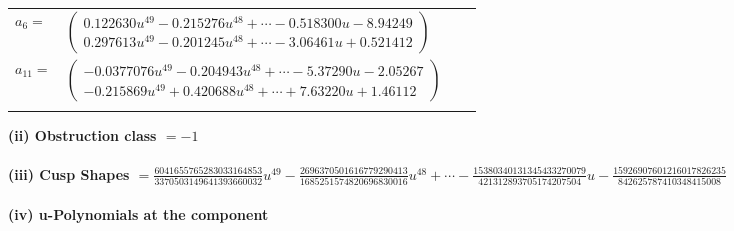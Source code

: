 \documentclass[1p]{elsarticle_modified}
\theoremstyle{definition}
\begin{document}
\begin{tabular}{m{7pt} m{180pt} m{7pt} m{180pt} }
\flushright $a_{6}=$&$\begin{pmatrix}0.122630 u^{49}-0.215276 u^{48}+\cdots-0.518300 u-8.94249\\0.297613 u^{49}-0.201245 u^{48}+\cdots-3.06461 u+0.521412\end{pmatrix}$ \\
\flushright $a_{11}=$&$\begin{pmatrix}-0.0377076 u^{49}-0.204943 u^{48}+\cdots-5.37290 u-2.05267\\-0.215869 u^{49}+0.420688 u^{48}+\cdots+7.63220 u+1.46112\end{pmatrix}$\\&\end{tabular}
\flushleft \textbf{(ii) Obstruction class $= -1$}\\~\\
\flushleft \textbf{(iii) Cusp Shapes $= \frac{6041655765283033164853}{3370503149641393660032} u^{49}-\frac{2696370501616779290413}{1685251574820696830016} u^{48}+\cdots-\frac{15380340131345433270079}{421312893705174207504} u-\frac{15926907601216017826235}{842625787410348415008}$}\\~\\
\newpage\renewcommand{\arraystretch}{1}
\flushleft \textbf{(iv) u-Polynomials at the component}\newline \\
\end{document}
